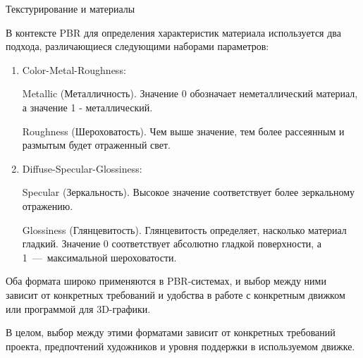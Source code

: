 \documentclass{beamer}
\begin{document}
	\begin{frame}{Текстурирование и материалы}

{	\footnotesize	
	В контексте PBR для определения характеристик материала используется два подхода, различающиеся следующими наборами параметров:

		\begin{enumerate}
			\item 
			Color-Metal-Roughness:
			
			Metallic (Металличность). %
			Значение 0 обозначает неметаллический материал, а значение 1 - металлический. 
			
			Roughness (Шероховатость). %
			Чем выше значение, тем более рассеянным и размытым будет отраженный свет.
			
			\item
			Diffuse-Specular-Glossiness:
			
			Specular (Зеркальность). %
			Высокое значение соответствует более зеркальному отражению.
			
			Glossiness (Глянцевитость). %
			Глянцевитость определяет, насколько материал гладкий. 
			Значение 0 соответствует абсолютно гладкой поверхности, а 1~---~максимальной шероховатости.

	\end{enumerate}
		
		
Оба формата широко применяются в PBR-системах, и выбор между ними зависит от конкретных требований и удобства в работе с конкретным движком или программой для 3D-графики.

В целом, выбор между этими форматами зависит от конкретных требований проекта, предпочтений художников и уровня поддержки в используемом движке.
}


\end{frame}
\end{document}
